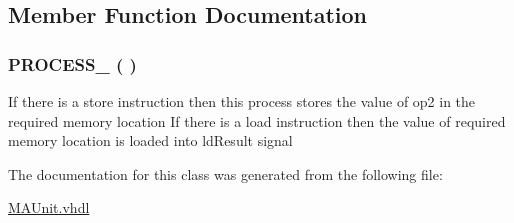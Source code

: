 \subsection{Member Function Documentation}
\hypertarget{class_m_a_unit_1_1_d_m_a031269c3515f7279dab9aede82457a06}{
\subsubsection[{P\-R\-O\-C\-E\-S\-S\-\_\-2}]{\setlength{\rightskip}{0pt plus 5cm} {\bfseries \textcolor{vhdlchar}{ }} P\-R\-O\-C\-E\-S\-S\-\_ ( ) \hspace{0.3cm}{\ttfamily [Process]}}}\label{class_m_a_unit_1_1_d_m_a031269c3515f7279dab9aede82457a06}
If there is a store instruction then this process stores the value of op2 in the required memory location If there is a load instruction then the value of required memory location is loaded into ld\-Result signal 

The documentation for this class was generated from the following file\-:\begin{DoxyCompactItemize}
\item 
\hyperlink{_m_a_unit_8vhdl}{M\-A\-Unit.\-vhdl}\end{DoxyCompactItemize}
